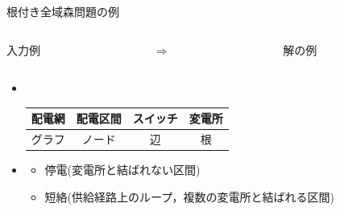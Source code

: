 \documentclass[dvipdfmx,11pt]{beamer}
\begin{document}
\begin{frame}{根付き全域森問題の例}
  \begin{columns}
    \begin{column}{0.45\textwidth}\centering
      \begin{exampleblock}{入力例}
	\centering
	
      \end{exampleblock}
    \end{column}
    \begin{column}{0.05\textwidth}\centering
      $\Rightarrow$
    \end{column}
    \begin{column}{0.45\textwidth}\centering
      \begin{exampleblock}{解の例}
        \centering
        
      \end{exampleblock}
    \end{column}
  \end{columns}
  \vfill
  \begin{itemize}
  \item {} \\
	 \begin{center}
      \begin{minipage}[c]{0.6\textwidth}
	   \begin{block}{}
		\centering
		\begin{tabular}{c|ccc}
		配電網 & 配電区間 & スイッチ & 変電所 \\
		\hline
		グラフ & ノード & 辺 & 根
		\end{tabular}
	   \end{block}
      \end{minipage}
	 \end{center}\vfill
   \item {}
		 \begin{itemize}
		  \item 停電(変電所と結ばれない区間)
		  \item 短絡(供給経路上のループ，複数の変電所と結ばれる区間)
		 \end{itemize}
  \end{itemize}
\end{frame}
\end{document}
